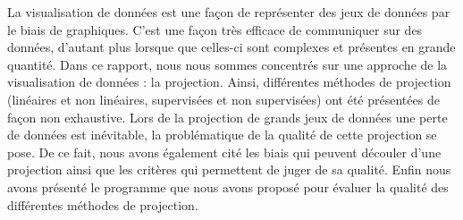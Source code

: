 
La visualisation de données est une façon de représenter des jeux de données par le biais de graphiques.
C'est une façon très efficace de communiquer sur des données, d'autant plus lorsque que celles-ci sont complexes et présentes en grande quantité.
Dans ce rapport, nous nous sommes concentrés sur une approche de la visualisation de données : la projection. 
Ainsi, différentes méthodes de projection (linéaires et non linéaires, supervisées et non supervisées) ont été présentées de façon non exhaustive. 
Lors de la projection de grands jeux de données une perte de données est inévitable, la problématique de la qualité de cette projection se pose. 
De ce fait, nous avons également cité les biais qui peuvent découler d'une projection ainsi que les critères qui permettent de juger de sa qualité.
Enfin nous avons présenté le programme que nous avons proposé pour évaluer la qualité des différentes méthodes de projection.

